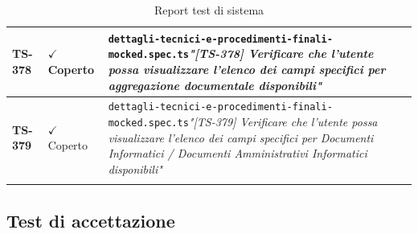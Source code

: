 \documentclass[a4paper,12pt]{article}
\newcommand{\ok}{\textcolor{green!60!black}{$\checkmark$ Coperto}}
\newcommand{\f}[1]{\nolinkurl{#1}\newline}
\newcommand{\q}[1]{\textit{#1}}
\begin{document}
\begin{longtable}{|p{1.5cm}|p{3.0cm}|p{10.5cm}|}
\textbf{TS-378} & \ok & \f{dettagli-tecnici-e-procedimenti-finali-mocked.spec.ts}\q{"[TS-378] Verificare che l'utente possa visualizzare l'elenco dei campi specifici per aggregazione documentale disponibili"} \\ \hline
\textbf{TS-379} & \ok & \f{dettagli-tecnici-e-procedimenti-finali-mocked.spec.ts}\q{"[TS-379] Verificare che l'utente possa visualizzare l'elenco dei campi specifici per Documenti Informatici / Documenti Amministrativi Informatici disponibili"} \\ \hline

\rowcolor{white}
\caption{Report test di sistema}
\label{tab:test-accettazione}
\end{longtable}


\subsection{Test di accettazione}
\end{document}
